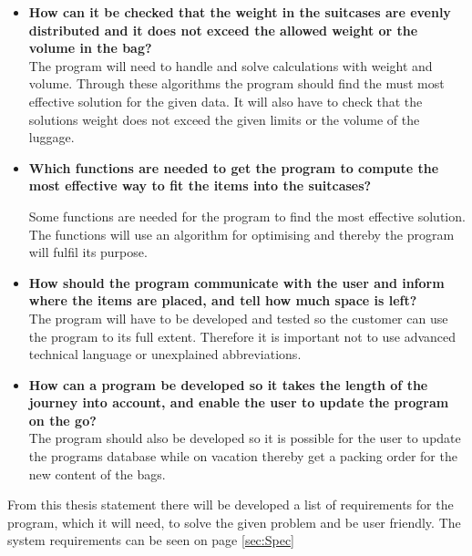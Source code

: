 \begin{itemize}
\item \textbf{How can it be checked that the weight in the suitcases are evenly distributed and it does not exceed the allowed weight or the volume in the bag?}\\

The program will need to handle and solve calculations with weight and volume. Through these algorithms the program should find the must most effective solution for the given data. It will also have to check that the solutions weight does not exceed the given limits or the volume of the luggage.

\item \textbf{Which functions are needed to get the program to compute the most effective way to fit the items into the suitcases?}\newline

Some functions are needed for the program to find the most effective solution. The functions will use an algorithm for optimising and thereby the program will fulfil its purpose.

\item \textbf{How should the program communicate with the user and inform where the items are placed, and tell how much space is left?}\\

The program will have to be developed and tested so the customer can use the program to its full extent. Therefore it is important not to use advanced technical language or unexplained abbreviations.

\item \textbf{How can a program be developed so it takes the length of the journey  into account, and enable the user to update the program on the go?}\\

The program should also be developed so it is possible for the user to update the programs database while on vacation thereby get a packing order for the new content of the bags.
\end{itemize}

From this thesis statement there will be developed a list of requirements for the program, which it will need, to solve the given problem and be user friendly. The system requirements can be seen on page \ref{sec:Spec}
